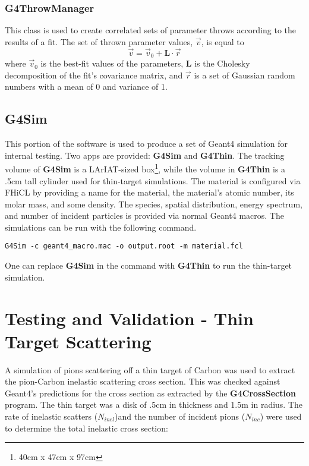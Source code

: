 \documentclass[12pt]{article}
\begin{document}
\subsubsection{G4ThrowManager}
This class is used to create correlated sets of parameter throws according to the results of a fit. The set of thrown parameter values, $\overrightarrow{v}$, is equal to
\begin{equation}
\vec{v} = \vec{v}_0 + \textbf{L} \cdot \vec{r}
\end{equation}
where $\vec{v}_0$ is the best-fit values of the parameters, $\textbf{L}$ is the Cholesky decomposition of the fit's covariance matrix, and $\vec{r}$ is a set of Gaussian random numbers with a mean of 0 and variance of 1.
 
\subsection{G4Sim}
This portion of the software is used to produce a set of Geant4 simulation for internal testing. Two apps are provided: \textbf{G4Sim} and \textbf{G4Thin}. The tracking volume of \textbf{G4Sim} is a LArIAT-sized box\footnote{40cm x 47cm x 97cm}, while the volume in \textbf{G4Thin} is a .5cm tall cylinder used for thin-target simulations. The material is configured via FHiCL by providing a name for the material, the material's atomic number, its molar mass, and some density. The species, spatial distribution, energy spectrum, and number of incident particles is provided via normal Geant4 macros. The simulations can be run with the following command.

\begin{lstlisting}
G4Sim -c geant4_macro.mac -o output.root -m material.fcl
\end{lstlisting}
One can replace \textbf{G4Sim} in the command with \textbf{G4Thin} to run the thin-target simulation.

\section{Testing and Validation - Thin Target Scattering}
A simulation of pions scattering off a thin target of Carbon was used to extract the pion-Carbon inelastic scattering cross section. 
This was checked against Geant4's predictions for the cross section as extracted by the \textbf{G4CrossSection} program.
The thin target was a disk of .5cm in thickness and 1.5m in radius. The rate of inelastic scatters ($N_{inel}$)and the number of incident pions ($N_{inc}$) were used to determine the total inelastic cross section: 
\end{document}
